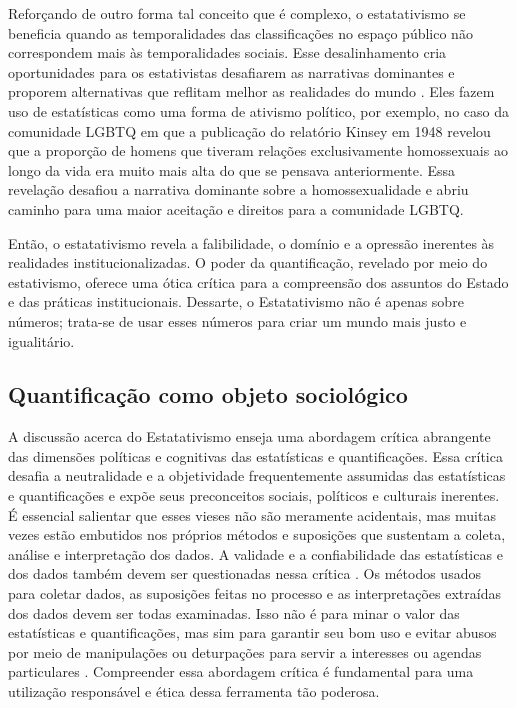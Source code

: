 Reforçando de outro forma tal conceito que é complexo, o estatativismo se beneficia quando as temporalidades das classificações no espaço público não correspondem mais às temporalidades sociais. Esse desalinhamento cria oportunidades para os estativistas desafiarem as narrativas dominantes e proporem alternativas que reflitam melhor as realidades do mundo \cite{lara2019acesso}. Eles fazem uso de estatísticas como uma forma de ativismo político, por exemplo, no caso da comunidade LGBTQ em que a publicação do relatório Kinsey em 1948 revelou que a proporção de homens que tiveram relações exclusivamente homossexuais ao longo da vida era muito mais alta do que se pensava anteriormente. Essa revelação desafiou a narrativa dominante sobre a homossexualidade e abriu caminho para uma maior aceitação e direitos para a comunidade LGBTQ.

Então, o estatativismo revela a falibilidade, o domínio e a opressão inerentes às realidades institucionalizadas. O poder da quantificação, revelado por meio do estativismo, oferece uma ótica crítica para a compreensão dos assuntos do Estado e das práticas institucionais. Dessarte, o Estatativismo não é apenas sobre números; trata-se de usar esses números para criar um mundo mais justo e igualitário.

\subsection{Quantificação como objeto sociológico}

A discussão acerca do Estatativismo enseja uma abordagem crítica abrangente das dimensões políticas e cognitivas das estatísticas e quantificações. Essa crítica desafia a neutralidade e a objetividade frequentemente assumidas das estatísticas e quantificações e expõe seus preconceitos sociais, políticos e culturais inerentes. É essencial salientar que esses vieses não são meramente acidentais, mas muitas vezes estão embutidos nos próprios métodos e suposições que sustentam a coleta, análise e interpretação dos dados. A validade e a confiabilidade das estatísticas e dos dados também devem ser questionadas nessa crítica \cite{lowrey2019data}. Os métodos usados para coletar dados, as suposições feitas no processo e as interpretações extraídas dos dados devem ser todas examinadas. Isso não é para minar o valor das estatísticas e quantificações, mas sim para garantir seu bom uso e evitar abusos por meio de manipulações ou deturpações para servir a interesses ou agendas particulares \cite{espeland2008sociology}. Compreender essa abordagem crítica é fundamental para uma utilização responsável e ética dessa ferramenta tão poderosa.

